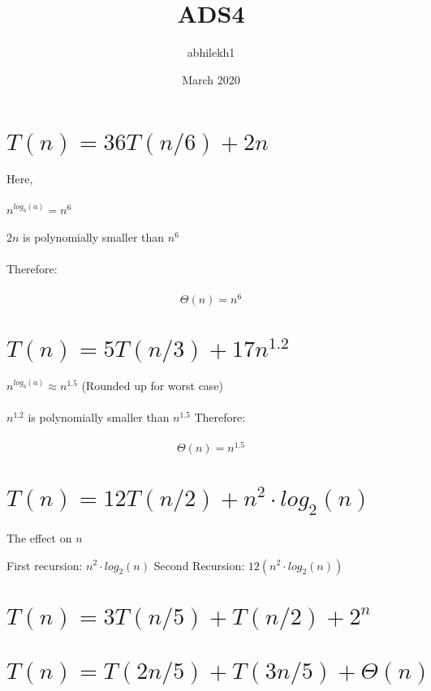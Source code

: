 \documentclass{article}
\title{ADS4}
\author{abhilekh1 }
\date{March 2020}
\begin{document}
\maketitle

\section{$T(n) = 36T(n/6) + 2n$}
Here,\\\\
$n^{log_{b}(a)} = n^6$\\\\
$2n$ is polynomially smaller than $n^6$\\\\
Therefore:\\\\
$$\Theta(n) = n^6$$

\section{$T(n) = 5T(n/3) + 17n^{1.2}$}

$n^{log_{b}(a)} \approx n^{1.5}$ (Rounded up for worst case)\\\\ 
$n^{1.2}$ is polynomially smaller than $n^{1.5}$
Therefore:\\\\
$$\Theta(n) = n^{1.5}$$


\section{$T(n) = 12T(n/2) + n^2 \cdot log_{2}(n)$}
The effect on $n$

First recursion: $n^2 \cdot log_{2}(n)$
Second Recursion: $12(n^2 \cdot log_{2}(n))$

\section{$T(n) = 3T(n/5) + T(n/2) + 2^n$}

\section{$T(n) = T(2n/5) + T(3n/5) + \Theta(n)$}
\end{document}
